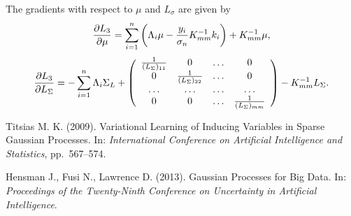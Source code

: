 \documentclass[12pt]{article}
\begin{document}
		The gradients with respect to $\mu$ and $L_{\sigma}$ are given by
		$$
		\frac{\partial L_3}{\partial \mu} =  \sum_{i=1}^n \left(\Lambda_i \mu - \frac {y_i}{\sigma_n} K_{mm}^{-1} k_i \right) + K_{mm}^{-1} \mu,
		$$
		$$\frac{\partial L_3}{\partial L_{\Sigma}} = - \sum_{i=1}^n \Lambda_i \Sigma_L +
		\left(
		\begin{array}{cccc}
		\frac 1 {(L_{\Sigma})_{11}} & 0 & \ldots & 0\\
		0 & \frac 1 {(L_{\Sigma})_{22}} & \ldots & 0\\
		\ldots & \ldots & \ldots & \ldots\\
		0 & 0 & \ldots & \frac 1 {(L_{\Sigma})_{mm}} \\
		\end{array}   
		\right) 
		- K_{mm}^{-1} L_{\Sigma}.
		$$

\pagebreak
\begin{thebibliography}{99}

Titsias M. K. (2009).  Variational Learning of Inducing Variables in Sparse Gaussian
Processes.  In: {\it International Conference on Artificial Intelligence and Statistics}, pp.~567–574.

Hensman J., Fusi N., Lawrence D. (2013).  Gaussian Processes for Big Data.  In: {\it Proceedings of the Twenty-Ninth Conference on Uncertainty in Artificial Intelligence}.

\end{thebibliography}	
\end{document}
